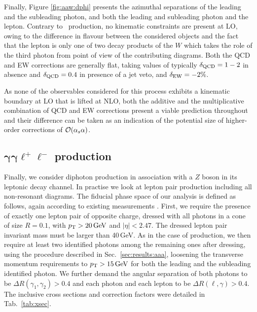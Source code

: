 Finally, Figure \ref{fig:aaw:dphi} presents the azimuthal 
separations of the leading and the subleading photon, and 
both the leading and subleading photon and the lepton. 
Contrary to \aaa\ production, no kinematic constraints 
are present at LO, owing to the difference in flavour 
between the considered objects and the fact that the 
lepton is only one of two decay products of the $W$ which 
takes the role of the third photon from point of view of 
the contributing diagrams. 
Both the QCD and EW corrections are generally flat, taking 
values of typically $\delta_\text{QCD}=1-2$ in absence and 
$\delta_\text{QCD}=0.4$ in presence of a jet veto, and 
$\delta_\text{EW}=-2\%$.


As none of the observables considered for this process 
exhibits a kinematic boundary at LO that is lifted at 
NLO, both the additive and the multiplicative combination 
of QCD and EW corrections present a viable prediction 
throughout and their difference can be taken as an 
indication of the potential size of higher-order corrections 
of $\mathcal{O}(\alpha_s\alpha)$.



\subsection[\texorpdfstring{$\gamma\gamma\ell^+\ell^-$}{aall} production]
           {$\boldsymbol{\gamma\gamma\ell^+\ell^-}$ production}
\label{sec:results:aaz}

Finally, we consider diphoton production in association with 
a $Z$ boson in its leptonic decay channel. 
In practise we look at lepton pair production including 
all non-resonant diagrams.
The fiducial phase space of our analysis is defined as follows, again according 
to existing measurements \cite{Aad:2016sau}. 
First, we require the presence of exactly one lepton pair 
of opposite charge, dressed with all photons in a cone of 
size $R=0.1$, with $p_\text{T}>20\,\text{GeV}$ and $|\eta|<2.47$. 
The dressed lepton pair invariant mass must be larger than 40\,GeV. 
As in the case of \aaw production, we then require at least 
two identified photons among the remaining ones after dressing, 
using the procedure described in Sec.\ \ref{sec:results:aaa}, 
loosening the transverse momentum requirements to 
$p_\text{T}>15\,\text{GeV}$ for both the leading and the subleading 
identified photon. 
We further demand the angular separation of both photons 
to be $\Delta R(\gamma_1,\gamma_2)>0.4$ and each photon and 
each lepton to be $\Delta R(\ell,\gamma)>0.4$.
The inclusive cross sections and correction factors were 
detailed in Tab.\ \ref{tab:xsec}.

